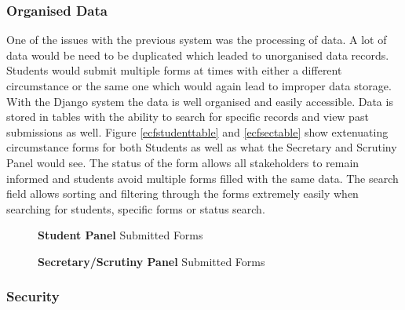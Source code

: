\documentclass[../main.tex]{subfiles}
\begin{document}
      
\subsubsection{Organised Data}
One of the issues with the previous system was the processing of data. A lot of data would be need to be duplicated which leaded to unorganised data records. Students would submit multiple forms at times with either a different circumstance or the same one which would again lead to improper data storage. With the Django system the data is well organised and easily accessible. Data is stored in tables with the ability to search for specific records and view past submissions as well.  Figure \ref{ecfstudenttable} and \ref{ecfsectable} show extenuating circumstance forms for both Students as well as what the Secretary and Scrutiny Panel would see. The status of the form allows all stakeholders to remain informed and students avoid multiple forms filled with the same data. The search field allows sorting and filtering through the forms extremely easily when searching for students, specific forms or status search. 

\begin{figure}[H]
        \caption{\label{fig:ecfstudenttable} \textbf{Student Panel} Submitted Forms}
      \end{figure}
 
\begin{figure}[H]
        \caption{\label{fig:ecfsectable} \textbf{Secretary/Scrutiny Panel} Submitted Forms}
      \end{figure}

\subsubsection{Security}      
\end{document}
